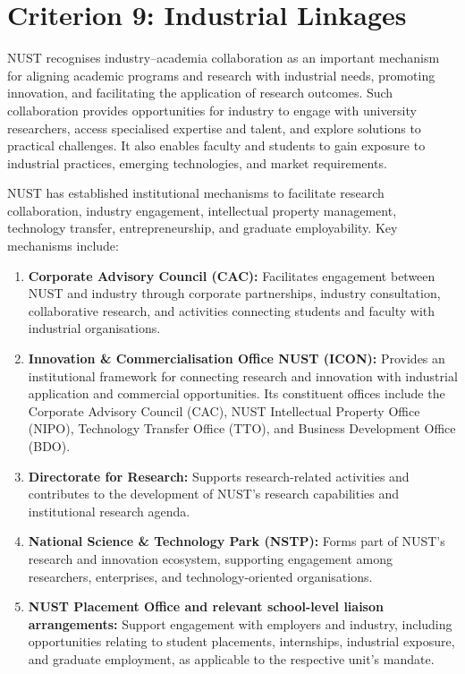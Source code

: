 \providecommand{\real}[1]{#1}
\providecommand{\tightlist}{}

\hypertarget{criterion-9-industrial-linkages}{%
\chapter{Criterion 9: Industrial Linkages}\label{criterion-9-industrial-linkages}}

NUST recognises industry--academia collaboration as an important
mechanism for aligning academic programs and research with
industrial needs, promoting innovation, and facilitating the
application of research outcomes. Such collaboration provides
opportunities for industry to engage with university researchers,
access specialised expertise and talent, and explore solutions to
practical challenges. It also enables faculty and students to gain
exposure to industrial practices, emerging technologies, and market
requirements.

NUST has established institutional mechanisms to facilitate
research collaboration, industry engagement, intellectual property
management, technology transfer, entrepreneurship, and graduate
employability. Key mechanisms include:

\begin{enumerate}
    \item \textbf{Corporate Advisory Council (CAC):}
    Facilitates engagement between NUST and industry through
    corporate partnerships, industry consultation, collaborative
    research, and activities connecting students and faculty with
    industrial organisations.

    \item \textbf{Innovation \& Commercialisation Office NUST (ICON):}
    Provides an institutional framework for connecting research
    and innovation with industrial application and commercial
    opportunities. Its constituent offices include the Corporate
    Advisory Council (CAC), NUST Intellectual Property Office
    (NIPO), Technology Transfer Office (TTO), and Business
    Development Office (BDO).

    \item \textbf{Directorate for Research:}
    Supports research-related activities and contributes to the
    development of NUST's research capabilities and institutional
    research agenda.

    \item \textbf{National Science \& Technology Park (NSTP):}
    Forms part of NUST's research and innovation ecosystem,
    supporting engagement among researchers, enterprises, and
    technology-oriented organisations.

    \item \textbf{NUST Placement Office and relevant school-level
    liaison arrangements:}
    Support engagement with employers and industry, including
    opportunities relating to student placements, internships,
    industrial exposure, and graduate employment, as applicable
    to the respective unit's mandate.
\end{enumerate}

